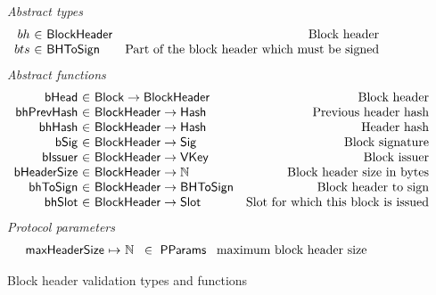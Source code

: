 \documentclass[11pt,a4paper]{article}
\newcommand{\fun}[1]{\mathsf{#1}}
\newcommand{\type}[1]{\mathsf{#1}}
\newcommand{\totalf}{\to}
\newcommand{\partialf}{\mapsto}
\newcommand{\Hash}{\type{Hash}}  %
\newcommand{\Slot}{\type{Slot}}
\newcommand{\Block}{\type{Block}}
\newcommand{\VKey}{\type{VKey}}
\newcommand{\Sig}{\type{Sig}}
\newcommand{\ProtParams}{\type{PParams}} %
\newcommand{\bhdrsizename}{bHeaderSize}
\newcommand{\bsigname}{bSig}
\newcommand{\bissuername}{bIssuer}
\begin{document}
\begin{figure}[ht]
  \emph{Abstract types}
  \begin{equation*}
    \begin{array}{r@{~\in~}lr}
    bh & \Bhead & \text{Block header} \\
    bts & \Bhtosign & \text{Part of the block header which must be signed}
    \end{array}
  \end{equation*}
  \emph{Abstract functions}
  \begin{equation*}
    \begin{array}{r@{~\in~}lr}
    \fun{\bheadname} & \Block \totalf \Bhead & \text{Block header} \\
    \fun{\bhprevhashname} & \Bhead \totalf \Hash & \text{Previous header hash} \\
    \fun{\bhhashname} & \Bhead \totalf \Hash & \text{Header hash} \\
    \fun{\bsigname} & \Bhead \totalf \Sig & \text{Block signature} \\
    \fun{\bissuername} & \Bhead \totalf \VKey & \text{Block issuer} \\
    \fun{\bhdrsizename} & \Bhead \totalf \mathbb{N} & \text{Block header size in bytes}\\
    \fun{\bhtosignname} & \Bhead \totalf \Bhtosign & \text{Block header to sign}\\
    \fun{\bhslotname} & \Bhead \totalf \Slot & \text{Slot for which this block is issued}
    \end{array}
  \end{equation*}
  \emph{Protocol parameters}
  \begin{equation*}
    \begin{array}{r@{~\partialf~}l!{~\in~\ProtParams~}r}
    \maxheadersize & \mathbb{N} & \text{maximum block header size} \\
    \end{array}
  \end{equation*}
  \caption{Block header validation types and functions}
  \label{fig:defs:bhead}
\end{figure}
\end{document}
